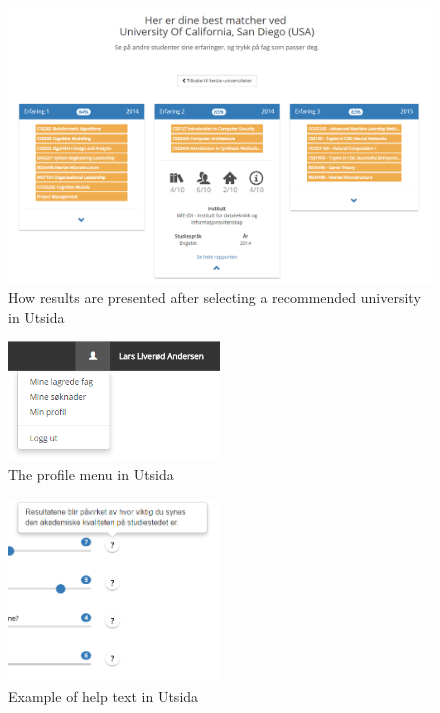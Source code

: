 \begin{figure}
    \centering
    \includegraphics[width=1\textwidth]{fig/utsida_screenshots/results_2.PNG}
    \caption{How results are presented after selecting a recommended university in Utsida}
    \label{fig:my_label}
\end{figure}
\begin{figure}
    \centering
    \includegraphics[width=0.5\textwidth]{fig/utsida_screenshots/profile_menu.png}
    \caption{The profile menu in Utsida}
    \label{fig:my_label}
\end{figure}
\begin{figure}
    \centering
    \includegraphics[width=0.5\textwidth]{fig/utsida_screenshots/help_text.png}
    \caption{Example of help text in Utsida}
    \label{fig:my_label}
\end{figure}
